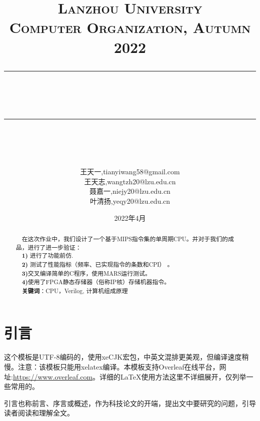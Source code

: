 \documentclass[12pt]{article} %
\newcommand{\horrule}[1]{\rule[0.5ex]{\linewidth}{#1}} 	%
\begin{document}
\title{
{\normalfont\normalsize\textsc{
Lanzhou University\\
Computer Organization, Autumn 2022 \\[25pt]}}
\horrule{0.5pt}\\
\horrule{1.8pt}\\[20pt]
}
\author{王天一,tianyiwang58@gmail.com\\
	王天志,wangtzh20@lzu.edu.cn\\
	聂嘉一,niejy20@lzu.edu.cn\\
	叶清扬,yeqy20@lzu.edu.cn}
\date{2022年4月} %

\begin{titlepage}
\maketitle
\vspace{30pt}
\begin{abstract}
\normalsize \ \ 在这次作业中，我们设计了一个基于MIPS指令集的单周期CPU。并对于我们的成品，进行了进一步验证： \\
\ \ \textbf{1)} 进行了功能前仿.\\
\ \  \textbf{2)} 测试了性能指标（频率、已实现指令的条数和CPI） 。\\
\ \ \textbf{3)}交叉编译简单的C程序，使用MARS运行测试。\\
\ \ \textbf{4)}使用了FPGA静态存储器（俗称IP核）存储机器指令。\\[5pt]
\indent \ \ \textbf{关键词}：CPU，Verilog, 计算机组成原理
\end{abstract}
\thispagestyle{empty}
\end{titlepage}

\tableofcontents
\thispagestyle{empty}

\newpage
\setcounter{page}{1}

\section{引言}
这个模板是UTF-8编码的，使用xeCJK宏包，中英文混排更美观，但编译速度稍慢。注意：该模板只能用xelatex编译。本模板支持Overleaf在线\LaTeXe 平台，网址:\url{https://www.overleaf.com}。详细的\LaTeX 使用方法这里不详细展开，仅列举一些常用的。

引言也称前言、序言或概述，作为科技论文的开端，提出文中要研究的问题，引导读者阅读和理解全文。
\end{document}
